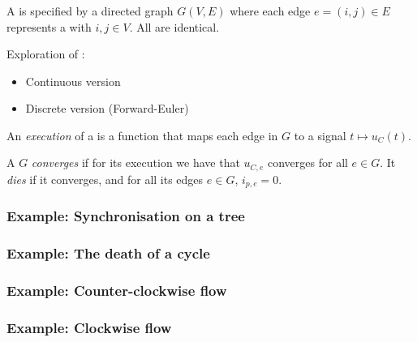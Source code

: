 \documentclass[	hyperref={pdfpagelabels=false}, xcolor=dvipsnames,
		11pt]{beamer}
\begin{document}
\begin{frame}
    \frametitle{\Pns}

    A \Pn is specified by a directed graph $G(V,E)$ where each edge $e = (i, j) \in E$ represents a \Pe with $i, j \in V$. All \Pes are identical.

    \begin{block}{Exploration of \Pns:}

    	\begin{itemize}
    		\item Continuous version
    		\item Discrete version (Forward-Euler)
    	\end{itemize}

    \end{block}

    An \emph{execution} of a \Pn is a function that maps each edge in $G$ to a signal $t \mapsto u_C(t)$.

    A \Pn $G$ \emph{converges} if for its execution we have that $u_{C,e}$ converges for all $e \in G$. It \emph{dies} if it converges, and for all its edges $e \in G$, $i_{p,e} = 0$.
\end{frame}

\begin{frame}
	\frametitle{Example: Synchronisation on a tree}
		\begin{figure}
			\centering
			\captionsetup[subfloat]{position=bottom,labelformat=empty,font=scriptsize}
		\end{figure}
\end{frame}

\begin{frame}
	\frametitle{Example: The death of a cycle}
		\begin{figure}
			\centering
			\captionsetup[subfloat]{position=bottom,labelformat=empty,font=scriptsize}
		\end{figure}
\end{frame}
\begin{frame}
	\frametitle{Example: Counter-clockwise flow}
		\begin{figure}
			\centering
			\captionsetup[subfloat]{position=bottom,labelformat=empty,font=scriptsize}
		\end{figure}
\end{frame}
\begin{frame}
	\frametitle{Example: Clockwise flow}
		\begin{figure}
			\centering
			\captionsetup[subfloat]{position=bottom,labelformat=empty,font=scriptsize}
		\end{figure}
\end{frame}
\end{document}
